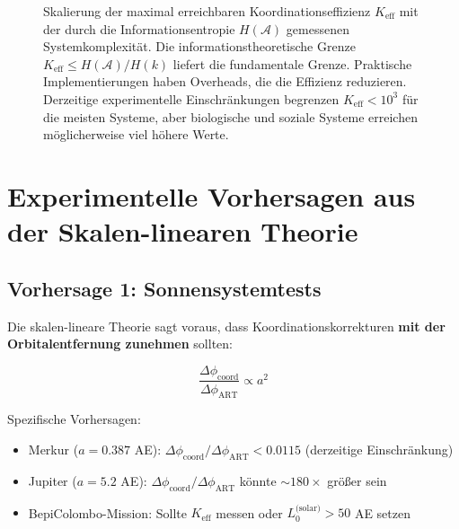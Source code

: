 \documentclass[11pt,a4paper]{article}
\begin{document}
\begin{figure}[htbp]
{
		}
		\caption{Skalierung der maximal erreichbaren Koordinationseffizienz $K_{\mathrm{eff}}$ mit der durch die Informationsentropie $H(\mathcal{A})$ gemessenen Systemkomplexität. Die informationstheoretische Grenze $K_{\mathrm{eff}} \leq H(\mathcal{A})/H(k)$ liefert die fundamentale Grenze. Praktische Implementierungen haben Overheads, die die Effizienz reduzieren. Derzeitige experimentelle Einschränkungen begrenzen $K_{\mathrm{eff}} < 10^3$ für die meisten Systeme, aber biologische und soziale Systeme erreichen möglicherweise viel höhere Werte.}
		\label{fig:keff-scaling}
	\end{figure}
	
	\section{Experimentelle Vorhersagen aus der Skalen-linearen Theorie}
	\label{sec:scale-predictions}
	
	\subsection{Vorhersage 1: Sonnensystemtests}
	
	Die skalen-lineare Theorie sagt voraus, dass Koordinationskorrekturen \textbf{mit der Orbitalentfernung zunehmen} sollten:
	
	\begin{equation}
		\frac{\Delta\phi_{\text{coord}}}{\Delta\phi_{\text{ART}}} \propto a^2
	\end{equation}
	
	Spezifische Vorhersagen:
	\begin{itemize}
		\item Merkur ($a = 0.387$ AE): $\Delta\phi_{\text{coord}}/\Delta\phi_{\text{ART}} < 0.0115$ (derzeitige Einschränkung)
		\item Jupiter ($a = 5.2$ AE): $\Delta\phi_{\text{coord}}/\Delta\phi_{\text{ART}}$ könnte $\sim 180\times$ größer sein
		\item BepiColombo-Mission: Sollte $K_{\mathrm{eff}}$ messen oder $L_0^{\text{(solar)}} > 50$ AE setzen
	\end{itemize}
	
\end{document}

